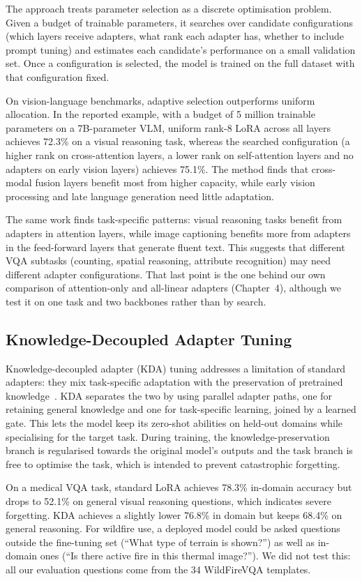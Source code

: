 \documentclass[12pt]{report}
\begin{document}
The approach treats parameter selection as a discrete optimisation problem. Given a budget of trainable parameters, it searches over candidate configurations (which layers receive adapters, what rank each adapter has, whether to include prompt tuning) and estimates each candidate's performance on a small validation set. Once a configuration is selected, the model is trained on the full dataset with that configuration fixed.

On vision-language benchmarks, adaptive selection outperforms uniform allocation. In the reported example, with a budget of 5 million trainable parameters on a 7B-parameter VLM, uniform rank-8 LoRA across all layers achieves 72.3\% on a visual reasoning task, whereas the searched configuration (a higher rank on cross-attention layers, a lower rank on self-attention layers and no adapters on early vision layers) achieves 75.1\%. The method finds that cross-modal fusion layers benefit most from higher capacity, while early vision processing and late language generation need little adaptation.

The same work finds task-specific patterns: visual reasoning tasks benefit from adapters in attention layers, while image captioning benefits more from adapters in the feed-forward layers that generate fluent text. This suggests that different VQA subtasks (counting, spatial reasoning, attribute recognition) may need different adapter configurations. That last point is the one behind our own comparison of attention-only and all-linear adapters (Chapter~4), although we test it on one task and two backbones rather than by search.

\subsection{Knowledge-Decoupled Adapter Tuning}
Knowledge-decoupled adapter (KDA) tuning addresses a limitation of standard adapters: they mix task-specific adaptation with the preservation of pretrained knowledge~\cite{kda2024}. KDA separates the two by using parallel adapter paths, one for retaining general knowledge and one for task-specific learning, joined by a learned gate. This lets the model keep its zero-shot abilities on held-out domains while specialising for the target task. During training, the knowledge-preservation branch is regularised towards the original model's outputs and the task branch is free to optimise the task, which is intended to prevent catastrophic forgetting.

On a medical VQA task, standard LoRA achieves 78.3\% in-domain accuracy but drops to 52.1\% on general visual reasoning questions, which indicates severe forgetting. KDA achieves a slightly lower 76.8\% in domain but keeps 68.4\% on general reasoning. For wildfire use, a deployed model could be asked questions outside the fine-tuning set (``What type of terrain is shown?'') as well as in-domain ones (``Is there active fire in this thermal image?''). We did not test this: all our evaluation questions come from the 34 WildFireVQA templates.
\end{document}
